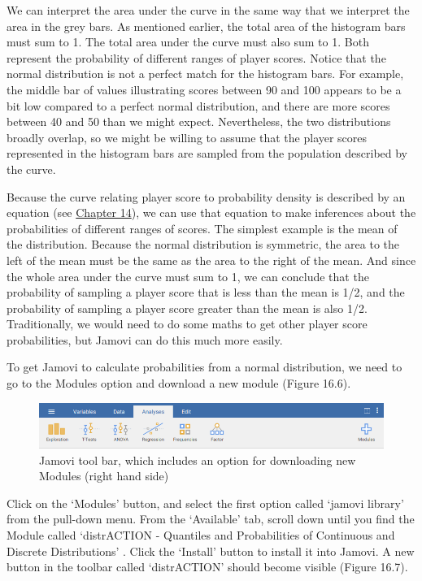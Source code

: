 \documentclass[
]{scrbook}
\begin{document}
We can interpret the area under the curve in the same way that we interpret the area in the grey bars.
As mentioned earlier, the total area of the histogram bars must sum to 1.
The total area under the curve must also sum to 1.
Both represent the probability of different ranges of player scores.
Notice that the normal distribution is not a perfect match for the histogram bars.
For example, the middle bar of values illustrating scores between 90 and 100 appears to be a bit low compared to a perfect normal distribution, and there are more scores between 40 and 50 than we might expect.
Nevertheless, the two distributions broadly overlap, so we might be willing to assume that the player scores represented in the histogram bars are sampled from the population described by the curve.

Because the curve relating player score to probability density is described by an equation (see \protect\hyperlink{Chapter_14}{Chapter 14}), we can use that equation to make inferences about the probabilities of different ranges of scores.
The simplest example is the mean of the distribution.
Because the normal distribution is symmetric, the area to the left of the mean must be the same as the area to the right of the mean.
And since the whole area under the curve must sum to 1, we can conclude that the probability of sampling a player score that is less than the mean is 1/2, and the probability of sampling a player score greater than the mean is also 1/2.
Traditionally, we would need to do some maths to get other player score probabilities, but Jamovi can do this much more easily.

To get Jamovi to calculate probabilities from a normal distribution, we need to go to the Modules option and download a new module (Figure 16.6).

\begin{figure}
\includegraphics[width=1\linewidth]{img/jamovi_toolbar_modules} \caption{Jamovi tool bar, which includes an option for downloading new Modules (right hand side)}\label{fig:unnamed-chunk-74}
\end{figure}

Click on the `Modules' button, and select the first option called `jamovi library' from the pull-down menu.
From the `Available' tab, scroll down until you find the Module called `distrACTION - Quantiles and Probabilities of Continuous and Discrete Distributions' \citep{Rihs2018}.
Click the `Install' button to install it into Jamovi.
A new button in the toolbar called `distrACTION' should become visible (Figure 16.7).
\end{document}
